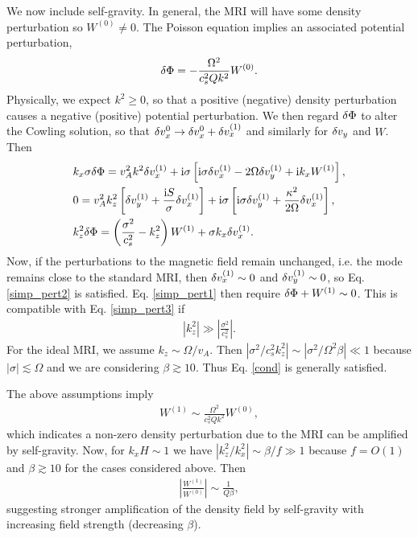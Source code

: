 We now include self-gravity. In general, the MRI will have some
density perturbation so $W^{(0)}\neq0$. The Poisson equation implies
an associated potential perturbation,    
\begin{align} 
  \delta \Phi = -\frac{\Omega^2}{c_s^2 Q k^2} W^{(0)}.
\end{align}
Physically, we expect $k^2\geq0$, so that a positive (negative) density
perturbation causes a negative (positive) potential perturbation. We
then regard $\delta \Phi$ to alter the Cowling solution, so
that $\delta v_x^{0} \to \delta v_x^{0} + \delta v_x^{(1)}$ and similarly for $\delta v_y$ and
$W$. Then 
\begin{align}
  &   k_x\sigma \delta \Phi = v_A^2k^2\delta v_x^{(1)} + \mathrm{i}\sigma\left[\mathrm{i}\sigma
  \delta v_x^{(1)} - 2\Omega\delta v_y^{(1)} + \mathrm{i} k_x W^{(1)}\right], \label{simp_pert1}\\ 
  &  0= v_A^2k_z^2\left[\delta v_y^{(1)} + \frac{\mathrm{i} S
    }{\sigma}\delta v_x^{(1)}\right] + \mathrm{i}\sigma\left[\mathrm{i}\sigma\delta v_y^{(1)} +
  \frac{\kappa^2}{2\Omega}\delta v_x^{(1)}\right],\label{simp_pert2}\\
  & k_z^2\delta \Phi  = \left(\frac{\sigma^2}{c_s^2}-k_z^2\right)W^{(1)} +
  \sigma k_x \delta v_x^{(1)}.\label{simp_pert3} 
\end{align}
Now, if the perturbations to the magnetic field remain
unchanged, i.e. the mode remains close to the standard MRI, then
$\delta v_x^{(1)} \sim 0$ and $\delta v_y^{(1)}\sim0$, so Eq. \ref{simp_pert2} is
satisfied. Eq. \ref{simp_pert1} then require $\delta \Phi +
W^{(1)}\sim0$. This is compatible with Eq. \ref{simp_pert3} if 
\begin{align}
  \left|k_z^2\right| \gg \left|\frac{\sigma^2}{c_s^2}\right|. \label{cond}
\end{align}
For the ideal MRI,  we assume $k_z\sim \Omega/v_A$. Then
$|\sigma^2/c_s^2k_z^2|\sim |\sigma^2/\Omega^2\beta|\ll1$ because
$|\sigma|\lesssim \Omega$ and we are considering $\beta\gtrsim
10$. Thus Eq. \ref{cond} is generally satisfied.   

The above assumptions imply
\begin{align}
  W^{(1)} \sim \frac{\Omega^2}{c_s^2 Q k^2} W^{(0)},\label{feedback}
\end{align} 
which indicates a non-zero density perturbation due to the
MRI can be amplified by self-gravity. Now, for $k_xH\sim 1$ we have
$|k_z^2/k_x^2|\sim \beta/f\gg1$ because $f=O(1)$ and $\beta\gtrsim10$
for the cases considered above. Then
\begin{align}
  \left|\frac{W^{(1)}}{W^{(0)}}\right| \sim \frac{1}{Q\beta}, 
\end{align}
 suggesting stronger amplification of the density field by 
 self-gravity with increasing field strength (decreasing
 $\beta$). 

